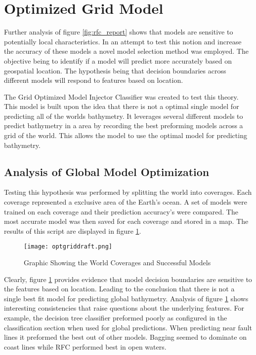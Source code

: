 \section{Optimized Grid Model}
\setlength{\parindent}{10ex}
Further analysis of figure \ref{fig:rfc_report} shows that models are sensitive to potentially local characteristics.
In an attempt to test this notion and increase the accuracy of these models a novel model selection method was employed.
The objective being to identify if a model will predict more accurately based on geospatial location.
The hypothesis being that decision boundaries across different models will respond to features based on location.

The Grid Optimized Model Injector Classifier was created to test this theory.
This model is built upon the idea that there is not a optimal single model for predicting all of the worlds bathymetry.
It leverages several different models to predict bathymetry in a area by recording the best preforming models across a grid of the world.
This allows the model to use the optimal model for predicting bathymetry.

\subsection{Analysis of Global Model Optimization}
Testing this hypothesis was performed by splitting the world into coverages.
Each coverage represented a exclusive area of the Earth's ocean.
A set of models were trained on each coverage and their prediction accuracy's were compared.
The most accurate model was then saved for each coverage and stored in a map.
The results of this script are displayed in figure \ref{fig:coveragegrid}.

\begin{figure}[h]
    \centering
    \texttt{[image: optgriddraft.png]}
    \caption{Graphic Showing the World Coverages and Successful Models}
    \label{fig:coveragegrid}
\end{figure}

\par
Clearly, figure \ref{fig:coveragegrid} provides evidence that model decision boundaries are sensitive to the features based on location.
Leading to the conclusion that there is not a single best fit model for predicting global bathymetry.
Analysis of figure \ref{fig:coveragegrid} shows interesting consistencies that raise questions about the underlying features.
For example, the decision tree classifier preformed poorly as configured in the classification section when used for global predictions.
When predicting near fault lines it preformed the best out of other models.
Bagging seemed to dominate on coast lines while \ac{RFC} performed best in open waters.


